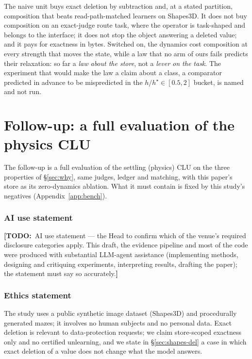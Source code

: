 \documentclass{article}
\newcommand{\TODO}[1]{{\color{orange}\textbf{[TODO:}~#1\textbf{]}}}
\begin{document}
The naive unit buys exact deletion by subtraction and, at a stated partition, composition that
beats read-path-matched learners on Shapes3D. It does not buy composition on an exact-judge route task, where the operator is
task-shaped and belongs to the interface; it does not stop the object answering a deleted value;
and it pays for exactness in bytes. Switched on, the dynamics cost composition at every strength
that moves the state, while a law that no arm of ours fails predicts their relaxation: so far a
\emph{law about the store}, not a \emph{lever on the task}. The experiment that would make the law a
claim about a class, a comparator predicted in advance to be mispredicted in the
$h/h^\star\in[0.5,2]$ bucket, is named and not run.

\section{Follow-up: a full evaluation of the physics CLU}
\label{sec:followup}

The follow-up is a full evaluation of the settling (physics) CLU on the three properties of
\S\ref{sec:why}, same judges, ledger and matching, with this paper's store as its zero-dynamics
ablation. What it must contain is fixed by this study's negatives (Appendix~\ref{app:bench}).

\subsubsection*{AI use statement}
\TODO{AI use statement --- the Head to confirm which of the venue's required disclosure categories
apply. This draft, the evidence pipeline and most of the code were produced with substantial LLM-agent
assistance (implementing methods, designing and critiquing experiments, interpreting results,
drafting the paper); the statement must say so accurately.}

\subsubsection*{Ethics statement}
The study uses a public synthetic image dataset (Shapes3D) and procedurally generated mazes; it
involves no human subjects and no personal data. Exact deletion is relevant to data-protection
requests; we claim store-scoped exactness only and no certified unlearning, and we state in
\S\ref{sec:shapes-del} a case in which exact deletion of a value does not change what the model
answers.
\end{document}
